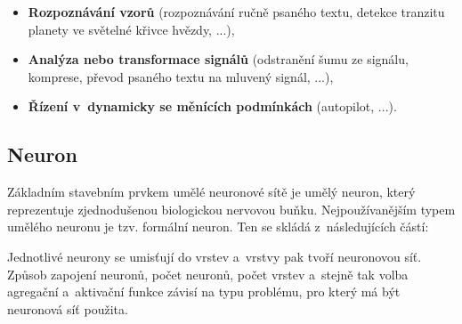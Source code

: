 \documentclass[a4paper,12pt]{article}
\begin{document}
{{{\begin{itemize}
\item \textbf{Rozpoznávání vzorů} (rozpoznávání ručně psaného textu, detekce tranzitu planety ve světelné křivce hvězdy, ...),

\item \textbf{Analýza nebo transformace signálů} (odstranění šumu ze signálu, komprese, převod psaného textu na mluvený signál, ...),

\item \textbf{Řízení v~dynamicky se měnících podmínkách} (autopilot, ...).~\cite{nn}

\end{itemize}

\subsection{Neuron}

Základním stavebním prvkem umělé neuronové sítě je umělý neuron, který reprezentuje zjednodušenou biologickou nervovou buňku. Nejpoužívanějším typem umělého neuronu je tzv. formální neuron. Ten se skládá z~následujících částí:

{

Jednotlivé neurony se umisťují do vrstev a~vrstvy pak tvoří neuronovou síť. Způsob zapojení neuronů, počet neuronů, počet vrstev a~stejně tak volba agregační a~aktivační funkce závisí na typu problému, pro který má být neuronová síť použita.

}}}}
\end{document}
